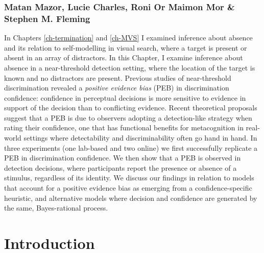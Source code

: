 \documentclass[12pt,twoside]{reedthesis}
\begin{document}
\hypertarget{matan-mazor-lucie-charles-roni-or-maimon-mor-stephen-m.-fleming}{%
\subsubsection*{Matan Mazor, Lucie Charles, Roni Or Maimon Mor \& Stephen M. Fleming}\label{matan-mazor-lucie-charles-roni-or-maimon-mor-stephen-m.-fleming}}

In Chapters \ref{ch-termination} and \ref{ch-MVS} I examined inference about absence and its relation to self-modelling in visual search, where a target is present or absent in an array of distractors. In this Chapter, I examine inference about absence in a near-threshold detection setting, where the location of the target is known and no distractors are present. Previous studies of near-threshold discrimination revealed a \emph{positive evidence bias} (PEB) in discrimination confidence: confidence in perceptual decisions is more sensitive to evidence in support of the decision than to conflicting evidence. Recent theoretical proposals suggest that a PEB is due to observers adopting a detection-like strategy when rating their confidence, one that has functional benefits for metacognition in real-world settings where detectability and discriminability often go hand in hand. In three experiments (one lab-based and two online) we first successfully replicate a PEB in discrimination confidence. We then show that a PEB is observed in detection decisions, where participants report the presence or absence of a stimulus, regardless of its identity. We discuss our findings in relation to models that account for a positive evidence bias as emerging from a confidence-specific heuristic, and alternative models where decision and confidence are generated by the same, Bayes-rational process.

\hypertarget{introduction-3}{%
\section{Introduction}\label{introduction-3}}
\end{document}
